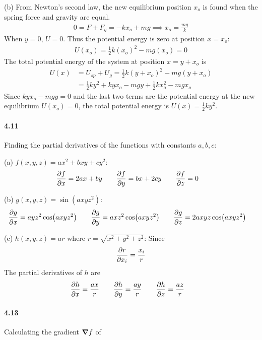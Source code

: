 \documentclass[../problems.tex]{subfiles}
\begin{document}
(b) From Newton's second law, the new equilibrium position $x_o$ is found when the spring force and
gravity are equal.
\begin{align*}
    0 = F + F_{g} = -kx_o + m g \implies x_o = \frac{mg}{k}
\end{align*}
When $y = 0$,  $U = 0$. Thus the potential energy is zero at position $x = x_o$:
\begin{align*}
    U(x_o) = \frac{1}{2} k(x_o)^2 - mg(x_o) = 0
\end{align*}
The total potential energy of the system at position $x = y + x_o$ is
\begin{align*}
    U(x) &= U_{sp} + U_{g} = \frac{1}{2} k(y+x_o)^2 - mg(y+x_o) \\
    &= \frac{1}{2} ky^2 + kyx_o - mgy + \frac{1}{2} kx_o^2 - mgx_o
\end{align*}
Since $kyx_o - mgy = 0$ and the last two terms are the potential energy at the new equilibrium
$U(x_o) = 0$, the total potential energy is $U(x) = \frac{1}{2} ky^2$.

\paragraph{4.11}
Finding the partial derivatives of the functions with constants $a,b,c$:

(a) $f(x,y,z) = ax^2 + bxy + cy^2$:
\begin{align*}
    \pdv{f}{x} &= 2ax + by \qquad \pdv{f}{y} = bx + 2cy \qquad \pdv{f}{z} = 0
\end{align*}

(b) $g(x,y,z) = \sin(axyz^2)$:
\begin{align*}
    \pdv{g}{x} &= ayz^2 \cos(axyz^2) \qquad \pdv{g}{y} = axz^2 \cos(axyz^2) 
    \qquad \pdv{g}{z} = 2axyz \cos(axyz^2)
\end{align*}

(c) $h(x,y,z) = ar$ where $r = \sqrt{x^2 + y^2 + z^2}$:
Since 
\begin{equation*}
    \pdv{r}{x_i} = \frac{x_i}{r}
\end{equation*}
The partial derivatives of $h$ are
\begin{align*}
    \pdv{h}{x} &= \frac{ax}{r} \qquad \pdv{h}{y} = \frac{ay}{r} \qquad \pdv{h}{z} = \frac{az}{r}
\end{align*}

\paragraph{4.13}
Calculating the gradient $\grad{f}$ of
\end{document}
